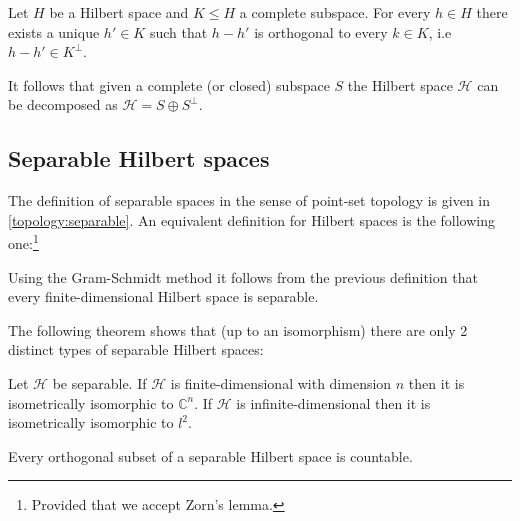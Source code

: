     \begin{theorem}
        \label{linalgebra:theorem:projection_theorem}
        Let $H$ be a Hilbert space and $K\leq H$ a complete subspace. For every $h\in H$ there exists a unique $h'\in K$ such that $h-h'$ is orthogonal to every $k\in K$, i.e $h-h'\in K^\perp$.
    \end{theorem}
    \begin{result}
        It follows that given a complete (or closed) subspace $S$ the Hilbert space $\mathcal{H}$ can be decomposed as $\mathcal{H} = S\oplus S^\perp$.
    \end{result}


\subsection{Separable Hilbert spaces}

    The definition of separable spaces in the sense of point-set topology is given in \ref{topology:separable}. An equivalent definition for Hilbert spaces is the following one:\footnote{Provided that we accept Zorn's lemma.}
    \begin{result}
        Using the Gram-Schmidt method it follows from the previous definition that every finite-dimensional Hilbert space is separable.
    \end{result}

    The following theorem shows that (up to an isomorphism) there are only 2 distinct types of separable Hilbert spaces:
    \begin{theorem}
        Let $\mathcal{H}$ be separable. If $\mathcal{H}$ is finite-dimensional with dimension $n$ then it is isometrically isomorphic to $\mathbb{C}^n$. If $\mathcal{H}$ is infinite-dimensional then it is isometrically isomorphic to $l^2$.
    \end{theorem}
    \begin{property}
        Every orthogonal subset of a separable Hilbert space is countable.
    \end{property}

